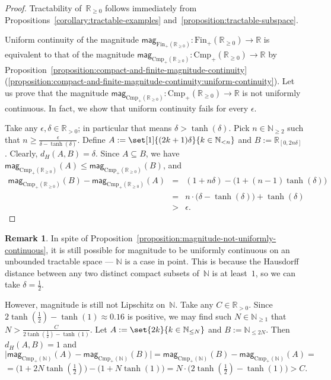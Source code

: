 \documentclass[11pt]{article}
\theoremstyle{plain}
\theoremstyle{definition}
\newtheorem{remark}[theorem]{Remark}
\newcommand{\NN}{\mathbb{N}}
\newcommand{\RR}{\mathbb{R}}
\newcommand{\intcc}[3][\RR]{{#1}_{[#2, #3]}}
\newcommand{\mg}[1][]{\mathsf{mag}_{#1}}
\newcommand{\fsub}{\mathrm{Fin}}
\newcommand{\ifsub}{\fsub_{+}}
\newcommand{\csub}{\mathrm{Cmp}}
\newcommand{\icsub}{\csub_{+}}
\begin{document}
\begin{proof}
Tractability of~$\RR_{\geq 0}$ follows immediately from Propositions~\ref{corollary:tractable-examples} and~\ref{proposition:tractable-subspace}.

Uniform continuity of the magnitude $\mg[\ifsub(\RR_{\geq 0})]\colon \ifsub(\RR_{\geq 0}) \to \RR$ is equivalent to that of the magnitude $\mg[\icsub(\RR_{\geq 0})]\colon\icsub(\RR_{\geq 0}) \to \RR$ by Proposition~\ref{proposition:compact-and-finite-magnitude-continuity}(\ref{proposition:compact-and-finite-magnitude-continuity:uniform-continuity}). Let us prove that the magnitude $\mg[\icsub(\RR_{\geq 0})]\colon\icsub(\RR_{\geq 0}) \to \RR$ is not uniformly continuous. In fact, we show that uniform continuity fails for every $\epsilon$.

Take any $\epsilon, \delta \in \RR_{> 0}$; in particular that means $\delta > \tanh(\delta)$. Pick $n \in \NN_{\geq 2}$ such that $n \geq \frac{\epsilon}{\delta - \tanh(\delta)}$. Define $A := \set[1]{(2k + 1) \delta}{k \in \NN_{< n}}$ and $B := \intcc{0}{2n \delta}$. Clearly, $d_H(A, B) = \delta$. 
Since $A \subseteq B$, we have $\mg[\icsub(\RR_{\geq 0})](A) \leq \mg[\icsub(\RR_{\geq 0})](B)$, and
\[
\begin{array}{rcl}
\mg[\icsub(\RR_{\geq 0})](B) - \mg[\icsub(\RR_{\geq 0})](A) &=& (1 + n \delta) - \big(1 + (n-1) \tanh(\delta)\big) \\&=& n \cdot \big(\delta - \tanh(\delta)\big) + \tanh(\delta)\\
&>& \epsilon.
\end{array}\]
\end{proof}

\begin{remark}\label{remark:magnitude-continuity-on-natural-numbers}
In spite of Proposition~\ref{proposition:magnitude-not-uniformly-continuous}, it is still possible for magnitude to be uniformly continuous on an unbounded tractable space --- $\NN$ is a case in point. This is because the Hausdorff distance between any two distinct compact subsets of~$\NN$ is at least~$1$, so we can take $\delta = \tfrac{1}{2}$.

However, magnitude is still not Lipschitz on~$\NN$. Take any $C \in \RR_{> 0}$. Since $2\tanh(\tfrac{1}{2}) - \tanh(1) \approx 0.16$ is positive, we may find such $N \in \NN_{\geq 1}$ that $N > \frac{C}{2\tanh(\frac{1}{2}) - \tanh(1)}$. Let $A := \set{2k}{k \in \NN_{\leq N}}$ and $B := \NN_{\leq 2N}$. Then $d_H(A, B) = 1$ and
\[\big|\mg[\icsub(\NN)](A) - \mg[\icsub(\NN)](B)\big| = \mg[\icsub(\NN)](B) - \mg[\icsub(\NN)](A) =\]
\[= \big(1 + 2N \tanh(\tfrac{1}{2})\big) - \big(1 + N \tanh(1)\big) = N \cdot \big(2\tanh(\tfrac{1}{2}) - \tanh(1)\big) > C.\]
\end{remark}
\end{document}
